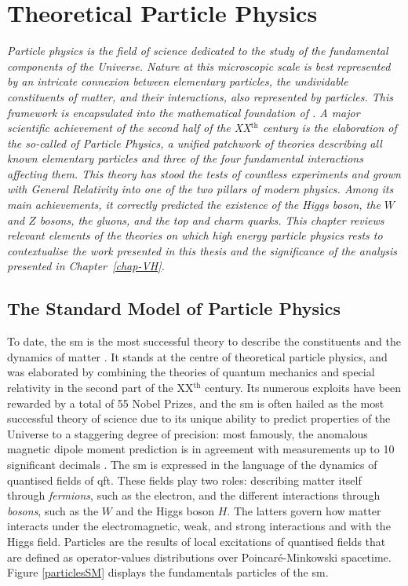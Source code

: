 \chapter{\color{oxfordblue} Theoretical Particle Physics}\label{chap-theory}
\ChapFrame

\textit{Particle physics is the field of science dedicated to the study of the fundamental components of the Universe. Nature at this microscopic scale is best represented by an intricate connexion between elementary particles, the undividable constituents of matter, and their interactions, also represented by particles. This framework is encapsulated into the mathematical foundation of . A major scientific achievement of the second half of the XX$^{\text{th}}$ century is the elaboration of the so-called  of Particle Physics, a unified patchwork of theories describing all known elementary particles and three of the four fundamental interactions affecting them. This theory has stood the tests of countless experiments and grown with General Relativity into one of the two pillars of modern physics. Among its main achievements, it correctly predicted the existence of the Higgs boson, the $W$ and $Z$ bosons, the gluons, and the top and charm quarks. This chapter reviews relevant elements of the theories on which high energy particle physics rests to contextualise the work presented in this thesis and the significance of the analysis presented in Chapter~\ref{chap-VH}.}

\section{The Standard Model of Particle Physics}\label{Section:SM}
To date, the \gls{sm} is the most successful theory to describe the constituents and the dynamics of matter \cite{SMphysics}. It stands at the centre of theoretical particle physics, and was elaborated by combining the theories of quantum mechanics and special relativity in the second part of the XX$^{\text{th}}$ century. Its numerous exploits have been rewarded by a total of 55 Nobel Prizes, and the \gls{sm} is often hailed as the most successful theory of science due to its unique ability to predict properties of the Universe to a staggering degree of precision: most famously, the anomalous magnetic dipole moment prediction is in agreement with measurements up to 10 significant decimals \cite{PhysRevA.83.052122}. The \gls{sm} is expressed in the language of the dynamics of quantised fields of \gls{qft}. These fields play two roles: describing matter itself through \textit{fermions}, such as the electron, and the different interactions through \textit{bosons}, such as the $W$ and the Higgs boson $H$. The latters govern how matter interacts under the electromagnetic, weak, and strong interactions and with the Higgs field. Particles are the results of local excitations of quantised fields that are defined as operator-values distributions over Poincaré-Minkowski spacetime. Figure \ref{particlesSM} displays the fundamentals particles of the \gls{sm}. \\

